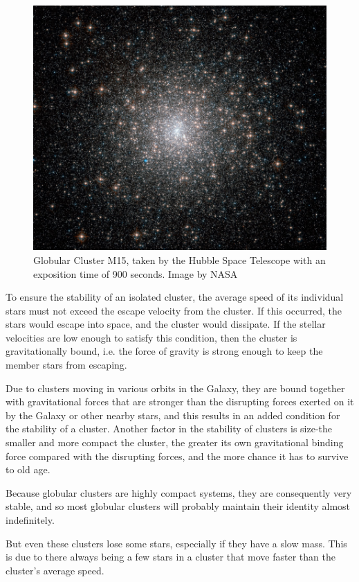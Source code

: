 \begin{figure}[H]
\centering
\includegraphics[width=12cm]{images/m15.jpg}
\caption{Globular Cluster M15, taken by the Hubble Space Telescope with an exposition time of 900 seconds. Image by NASA}
\end{figure}

To ensure the stability of an isolated cluster, the average speed of its individual stars must not exceed the escape velocity from the cluster. If this occurred, the stars would escape into space, and the cluster would dissipate. If the stellar velocities are low enough to satisfy this condition, then the cluster is gravitationally bound, i.e. the force of gravity is strong enough to keep the member stars from escaping.

Due to clusters moving in various orbits in the Galaxy, they are bound together with gravitational forces that are stronger than the disrupting forces exerted on it by the Galaxy or other nearby stars, and this results in an added condition for the stability of a cluster. Another factor in the stability of clusters is size-the smaller and more compact the cluster, the greater its own gravitational binding force compared with the disrupting forces, and the more chance it has to survive to old age.

Because globular clusters are highly compact systems, they are consequently very stable, and so most globular clusters will probably maintain their identity almost indefinitely.

But even these clusters lose some stars, especially if they have a slow mass. This is due to there always being a few stars in a cluster that move faster than the cluster's average speed.

